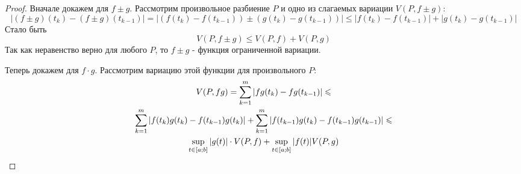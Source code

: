 \begin{proof}
	Вначале докажем для $f \pm g$. Рассмотрим произвольное разбиение $P$ и одно из слагаемых вариации $V(P, f \pm g)$:
	\[
		|(f \pm g)(t_k) - (f \pm g)(t_{k - 1})| = |(f(t_k) - f(t_{k - 1})) \pm (g(t_k) - g(t_{k - 1}))| \le |f(t_k) - f(t_{k - 1})| + |g(t_k) - g(t_{k - 1})|
	\]
	Стало быть
	\[
		V(P, f \pm g) \le V(P, f) + V(P, g)
	\]
	Так как неравенство верно для любого $P$, то $f \pm g$ - функция ограниченной вариации.
	
	Теперь докажем для $f \cdot g$. Рассмотрим вариацию этой функции для произвольного $P$:
	\begin{multline*}
		V(P, fg) = \sum\limits_{k = 1}^m |fg(t_k) - fg(t_{k - 1})| \leqslant
		\\
		\sum\limits_{k = 1}^m |f(t_k)g(t_k) - f(t_{k - 1})g(t_k)| + \sum\limits_{k = 1}^m |f(t_{k - 1})g(t_k) - f(t_{k - 1})g(t_{k - 1})| \leqslant
		\\
		\sup\limits_{t \in [a; b]} |g(t)| \cdot V(P, f) + \sup\limits_{t \in [a; b]} |f(t)| V(P, g)
	\end{multline*}
\end{proof}